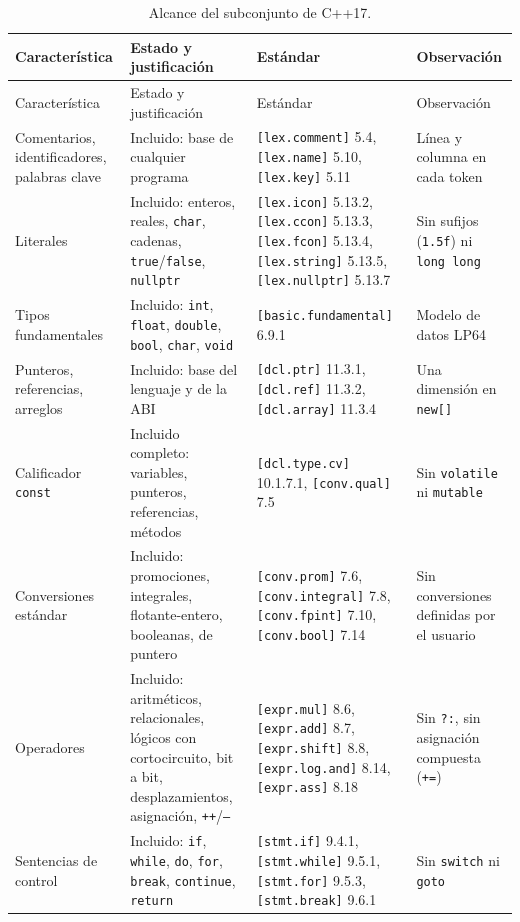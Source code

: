 \documentclass[11pt,a4paper]{article}
\newcommand{\cod}[1]{\texttt{#1}}
\begin{document}
{\footnotesize\raggedright
\begin{longtable}{p{2.6cm}p{4.3cm}p{4.4cm}p{3.4cm}}
\caption{Alcance del subconjunto de C++17.}\label{tab:alcance}\\
\toprule Característica & Estado y justificación & Estándar & Observación \\ \midrule \endfirsthead
\toprule Característica & Estado y justificación & Estándar & Observación \\ \midrule \endhead
Comentarios, identificadores, palabras clave & Incluido: base de cualquier programa & \cod{[lex.comment]} 5.4, \cod{[lex.name]} 5.10, \cod{[lex.key]} 5.11 & Línea y columna en cada token \\
Literales & Incluido: enteros, reales, \cod{char}, cadenas, \cod{true}/\cod{false}, \cod{nullptr} & \cod{[lex.icon]} 5.13.2, \cod{[lex.ccon]} 5.13.3, \cod{[lex.fcon]} 5.13.4, \cod{[lex.string]} 5.13.5, \cod{[lex.nullptr]} 5.13.7 & Sin sufijos (\cod{1.5f}) ni \cod{long long} \\
Tipos fundamentales & Incluido: \cod{int}, \cod{float}, \cod{double}, \cod{bool}, \cod{char}, \cod{void} & \cod{[basic.fundamental]} 6.9.1 & Modelo de datos LP64 \\
Punteros, referencias, arreglos & Incluido: base del lenguaje y de la ABI & \cod{[dcl.ptr]} 11.3.1, \cod{[dcl.ref]} 11.3.2, \cod{[dcl.array]} 11.3.4 & Una dimensión en \cod{new[]} \\
Calificador \cod{const} & Incluido completo: variables, punteros, referencias, métodos & \cod{[dcl.type.cv]} 10.1.7.1, \cod{[conv.qual]} 7.5 & Sin \cod{volatile} ni \cod{mutable} \\
Conversiones estándar & Incluido: promociones, integrales, flotante-entero, booleanas, de puntero & \cod{[conv.prom]} 7.6, \cod{[conv.integral]} 7.8, \cod{[conv.fpint]} 7.10, \cod{[conv.bool]} 7.14 & Sin conversiones definidas por el usuario \\
Operadores & Incluido: aritméticos, relacionales, lógicos con cortocircuito, bit a bit, desplazamientos, asignación, \cod{++}/\cod{--} & \cod{[expr.mul]} 8.6, \cod{[expr.add]} 8.7, \cod{[expr.shift]} 8.8, \cod{[expr.log.and]} 8.14, \cod{[expr.ass]} 8.18 & Sin \cod{?:}, sin asignación compuesta (\cod{+=}) \\
Sentencias de control & Incluido: \cod{if}, \cod{while}, \cod{do}, \cod{for}, \cod{break}, \cod{continue}, \cod{return} & \cod{[stmt.if]} 9.4.1, \cod{[stmt.while]} 9.5.1, \cod{[stmt.for]} 9.5.3, \cod{[stmt.break]} 9.6.1 & Sin \cod{switch} ni \cod{goto} \\

\end{longtable}}
\end{document}
